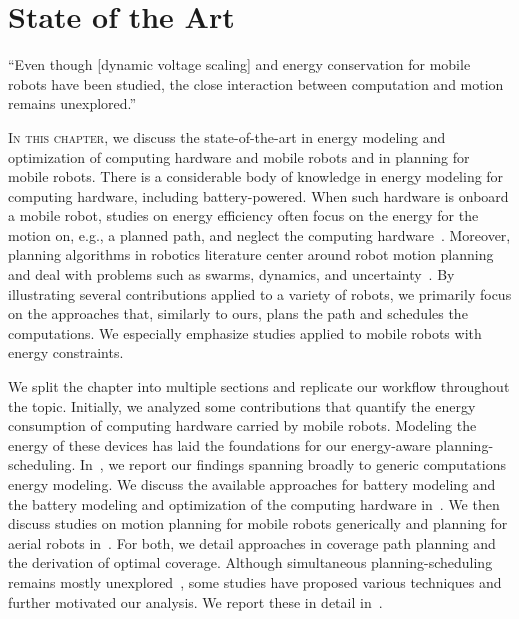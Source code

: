 %
%
%
%
\chapter{State of the Art}
\label{cp:soa}

\begin{chapquote}{\cite{brateman2006energy}}
  ``Even though [dynamic voltage scaling] and energy conservation for mobile robots have been studied, the close interaction between computation and motion remains unexplored.''
\end{chapquote}

\vspace*{1em}

\lettrine{I}{n this chapter}, we discuss the state-of-the-art in energy modeling and optimization of computing hardware and mobile robots and in planning for mobile robots. There is a considerable body of knowledge in energy modeling for computing hardware, including battery-powered. When such hardware is onboard a mobile robot, studies on energy efficiency often focus on the energy for the motion on, e.g., a planned path, and neglect the computing hardware~\citep{ondruska2015scheduled}. Moreover, planning algorithms in robotics literature center around robot motion planning and deal with problems such as swarms, dynamics, and uncertainty~\citep{lavalle2006planning}. By illustrating several contributions applied to a variety of robots, we primarily focus on the approaches that, similarly to ours, plans the path and schedules the computations. We especially emphasize studies applied to mobile robots with energy constraints.

We split the chapter into multiple sections and replicate our workflow throughout the topic. Initially, we analyzed some contributions that quantify the energy consumption of computing hardware carried by mobile robots. Modeling the energy of these devices has laid the foundations for our energy-aware planning-scheduling. In~, we report our findings spanning broadly to generic computations energy modeling. We discuss the available approaches for battery modeling and the battery modeling and optimization of the computing hardware in~. We then discuss studies on motion planning for mobile robots generically and planning for aerial robots in~. For both, we detail approaches in coverage path planning and the derivation of optimal coverage. Although simultaneous planning-scheduling remains mostly unexplored~\citep{brateman2006energy,ondruska2015scheduled,sudhakar2020balancing}, some studies have proposed various techniques and further motivated our analysis. We report these in detail in~.

